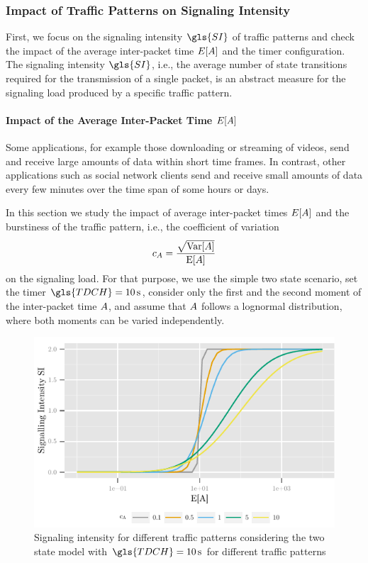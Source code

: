 \subsubsection*{Impact of Traffic Patterns on Signaling Intensity}\label{sec:network:performance_model:signaling_intensity}
First, we focus on the signaling intensity \(\gls{SI}\) of traffic patterns and check the impact of the average inter-packet time \(E[A]\) and the timer configuration. The signaling intensity \(\gls{SI}\), i.e., the average number of state transitions required for the transmission of a single packet, is an abstract measure for the signaling load produced by a specific traffic pattern.

\paragraph*{Impact of the Average Inter-Packet Time \(E[A]\)}\label{sec:network:performance_model:signaling_intensity:ea}
Some applications, for example those downloading or streaming of videos, send and receive large amounts of data within short time frames.
In contrast, other applications such as social network clients send and receive small amounts of data every few minutes over the time span of some hours or days.

In this section we study the impact of average inter-packet times \(E[A]\) and the burstiness of the traffic pattern, i.e., the coefficient of variation 
\[c_{A} = \frac{\sqrt{\mathrm{Var}[A]}}{\mathrm{E}[A]}\]
 on the signaling load.
For that purpose, we use the simple two state scenario, set the timer \(\gls{TDCH}=\SI{10}{\second}\), consider only the first and the second moment of the inter-packet time \(A\), and assume that \(A\) follows a lognormal distribution, where both moments can be varied independently.

\begin{figure}
	\centering
	\includegraphics{network/performance_model/numerical_examples/figures/2state_ea_si}
	\caption{Signaling intensity for different traffic patterns considering the two state model with \(\gls{TDCH}=\SI{10}{\second}\) for different traffic patterns}
	\label{fig:network:performance_model:numerical_examples:validations:analytic_vs_simulation:2state_ea_si}
\end{figure}

